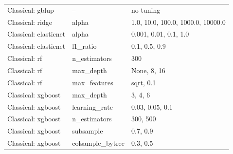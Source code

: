 \begin{longtable}{llp{7cm}}
Classical: gblup & -- & no tuning \\
Classical: ridge & alpha & 1.0, 10.0, 100.0, 1000.0, 10000.0 \\
Classical: elasticnet & alpha & 0.001, 0.01, 0.1, 1.0 \\
Classical: elasticnet & l1\_ratio & 0.1, 0.5, 0.9 \\
Classical: rf & n\_estimators & 300 \\
Classical: rf & max\_depth & None, 8, 16 \\
Classical: rf & max\_features & sqrt, 0.1 \\
Classical: xgboost & max\_depth & 3, 4, 6 \\
Classical: xgboost & learning\_rate & 0.03, 0.05, 0.1 \\
Classical: xgboost & n\_estimators & 300, 500 \\
Classical: xgboost & subsample & 0.7, 0.9 \\
Classical: xgboost & colsample\_bytree & 0.3, 0.5 \\
\end{longtable}
